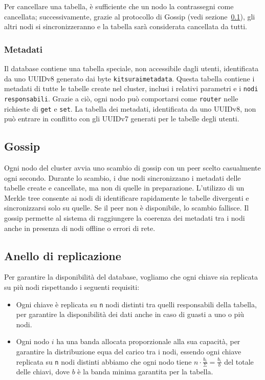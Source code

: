 Per cancellare una tabella, è sufficiente che un nodo la contrassegni come cancellata; successivamente, grazie al protocollo di Gossip (vedi sezione~\ref{subsec:gossip}), gli altri nodi si sincronizzeranno e la tabella sarà considerata cancellata da tutti.

\subsubsection{Metadati}
\label{subsubsec:metadati}

Il database contiene una tabella speciale, non accessibile dagli utenti, identificata da uno UUIDv8 generato dai byte \texttt{kitsuraimetadata}.
Questa tabella contiene i metadati di tutte le tabelle create nel cluster, inclusi i relativi parametri e i \texttt{nodi responsabili}.
Grazie a ciò, ogni nodo può comportarsi come \texttt{router} nelle richieste di \texttt{get} e \texttt{set}.
La tabella dei metadati, identificata da uno UUIDv8, non può entrare in conflitto con gli UUIDv7 generati per le tabelle degli utenti.

\subsection{Gossip}
\label{subsec:gossip}

Ogni nodo del cluster avvia uno scambio di gossip con un peer scelto casualmente ogni secondo.
Durante lo scambio, i due nodi sincronizzano i metadati delle tabelle create e cancellate, ma non di quelle in preparazione.
L'utilizzo di un Merkle tree consente ai nodi di identificare rapidamente le tabelle divergenti e sincronizzarsi solo su quelle.
Se il peer non è disponibile, lo scambio fallisce.
Il gossip permette al sistema di raggiungere la coerenza dei metadati tra i nodi anche in presenza di nodi offline o errori di rete.

\subsection{Anello di replicazione}
\label{subsec:anello-replicazione}

Per garantire la disponibilità del database, vogliamo che ogni chiave sia replicata su più nodi rispettando i seguenti requisiti:

\begin{itemize}
    \item Ogni chiave è replicata su \texttt{n} nodi distinti tra quelli responsabili della tabella, per garantire la disponibilità dei dati anche in caso di guasti a uno o più nodi.
    \item Ogni nodo $i$ ha una banda allocata proporzionale alla sua capacità, per garantire la distribuzione equa del carico tra i nodi, essendo ogni chiave replicata su \texttt{n} nodi distinti abbiamo che ogni nodo tiene $n \cdot \frac{b_i}{\Sigma} = \frac{b_i}{b}$ del totale delle chiavi, dove $b$ è la banda minima garantita per la tabella.
\end{itemize}

